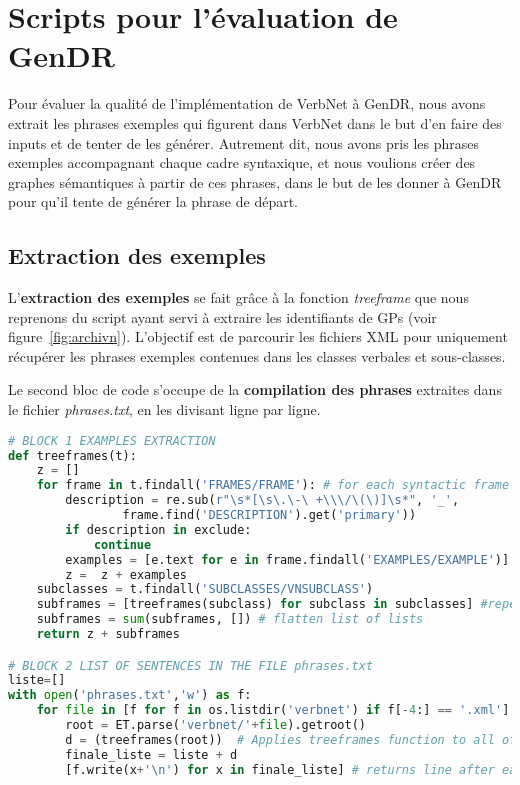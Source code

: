 \section{Scripts pour l'évaluation de GenDR}

Pour évaluer la qualité de l'implémentation de VerbNet à GenDR, nous avons extrait les phrases exemples qui figurent dans VerbNet dans le but d'en faire des inputs et de tenter de les générer. Autrement dit, nous avons pris les phrases exemples accompagnant chaque cadre syntaxique, et nous voulions créer des graphes sémantiques à partir de ces phrases, dans le but de les donner à GenDR pour qu'il tente de générer la phrase de départ.

\subsection{Extraction des exemples}

L'\textbf{extraction des exemples} se fait grâce à la fonction \emph{treeframe} que nous reprenons du script ayant servi à extraire les identifiants de \acp{GP} (voir figure~\ref{fig:archivn}). L'objectif est de parcourir les fichiers XML pour uniquement récupérer les phrases exemples contenues dans les classes verbales et sous-classes.

Le second bloc de code s'occupe de la \textbf{compilation des phrases} extraites dans le fichier \emph{phrases.txt}, en les divisant ligne par ligne. 

\begin{lstlisting}[language=Python, caption = Extraction des phrases exemples de VerbNet]
# BLOCK 1 EXAMPLES EXTRACTION
def treeframes(t):
    z = []
    for frame in t.findall('FRAMES/FRAME'): # for each syntactic frame
        description = re.sub(r"\s*[\s\.\-\ +\\\/\(\)]\s*", '_',
				frame.find('DESCRIPTION').get('primary'))
        if description in exclude:
            continue    
        examples = [e.text for e in frame.findall('EXAMPLES/EXAMPLE')] # get the examples
        z =  z + examples 
    subclasses = t.findall('SUBCLASSES/VNSUBCLASS')
    subframes = [treeframes(subclass) for subclass in subclasses] #repeat operation for subclasses
    subframes = sum(subframes, []) # flatten list of lists
    return z + subframes

# BLOCK 2 LIST OF SENTENCES IN THE FILE phrases.txt
liste=[]
with open('phrases.txt','w') as f:
    for file in [f for f in os.listdir('verbnet') if f[-4:] == '.xml']:
        root = ET.parse('verbnet/'+file).getroot()       
        d = (treeframes(root))  # Applies treeframes function to all of VerbNet files
        finale_liste = liste + d
        [f.write(x+'\n') for x in finale_liste] # returns line after each example

\end{lstlisting}

